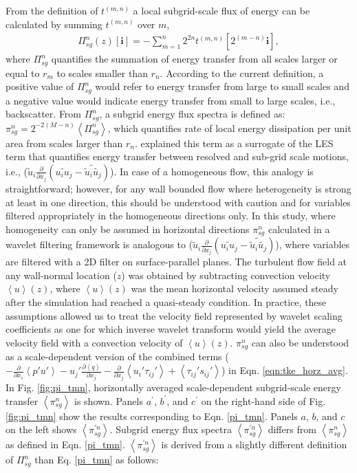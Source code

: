 From the definition of $t^{(m,n)}$ a local subgrid-scale flux of energy can be calculated by summing $t^{(m,n)}$ over $m$, 
\begin{align}
\Pi_{sg}^{n}(z)[\mathbf{i}] = -\sum_{m=1}^{n}2^{2n}t^{(m,n)}[2^{(m-n)}\mathbf{i}],
\label{pi_tmn}
\end{align}
\noindent where $\Pi_{sg}^{n}$ quantifies the summation of energy transfer from all scales larger or equal to $r_m$ to scales smaller than $r_n$. According to the current definition, a positive value of $\Pi_{sg}^{n}$ would refer to energy transfer from large to small scales and a negative value would indicate energy transfer from small to large scales, i.e., backscatter. From $\Pi_{sg}^{n}$, a subgrid energy flux spectra is defined as: $\pi_{sg}^{n}= 2^{-2(M-n)}\left < \Pi_{sg}^{n} \right >$, which quantifies rate of local energy dissipation per unit area from scales larger than $r_n$.  \citet{meneveau_91jfm} explained this term as a surrogate of the LES term that quantifies energy transfer between resolved and sub-grid scale motions, i.e., ($\tilde{u}_i\frac{\partial }{\partial x_j}(\widetilde{u_iu_j}-\widetilde{\tilde{u}_i\tilde{u_j}})$). In case of a homogeneous flow, this analogy is straightforward; however, for any wall bounded flow where heterogeneity is strong at least in one direction, this should be understood with caution and for variables filtered appropriately in the homogeneous directions only. In this study, where homogeneity can only be assumed in horizontal directions $\pi^{n}_{sg}$ calculated in a wavelet filtering framework is analogous to ($\tilde{u}_i\frac{\partial }{\partial x_j}(\widetilde{u_iu_j}-\widetilde{\tilde{u}_i\tilde{u_j}})$), where variables are filtered with a 2D filter on surface-parallel planes. The turbulent flow field at any wall-normal location ($z$) was obtained by subtracting convection velocity $\left < u \right >(z)$, where $\left < u \right > (z)$ was the mean horizontal velocity assumed steady after the simulation had reached a quasi-steady condition. In practice, these assumptions allowed us to treat the velocity field represented by wavelet scaling coefficients as one for which inverse wavelet transform  would yield the average velocity field with a convection velocity of $\left < u \right > (z)$. $\pi^{n}_{sg}$  can also be understood as a scale-dependent version of the combined terms ($-\frac{\partial }{\partial x_i}\left < p'u'\right>-u_j'\frac{\partial \left < q\right >}{\partial x_j}-\frac{\partial }{\partial x_j}\left < u_i'\tau_{ij}'\right >+\left < \tau_{ij}'s_{ij}'\right >$) in Eqn. \ref{eqn:tke_horz_avg}. In Fig. \ref{fig:pi_tmn}, horizontally averaged scale-dependent subgrid-scale energy transfer $\left < \pi^{n}_{sg} \right >$ is shown. Panels $a^\prime$, $b^\prime$, and $c^\prime$ on the right-hand side of Fig. \ref{fig:pi_tmn} show the results corresponding to Eqn. \ref{pi_tmn}. Panels $a$, $b$, and $c$ on the left shows $\left < \pi_{sg}^{\prime n} \right >$.  Subgrid energy flux spectra $\left < \pi_{sg}^{\prime n} \right >$ differs from $\left < \pi_{sg}^{n} \right >$ as defined in Eqn. \ref{pi_tmn}. $\left < \pi_{sg}^{\prime n} \right >$ is derived from  a slightly different definition of $\Pi_{sg}^{n}$ than Eq. \ref{pi_tmn} as follows: 
